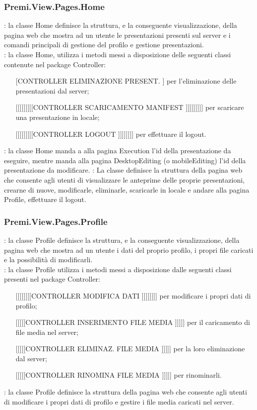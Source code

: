 {		\subsubsection{Premi.View.Pages.Home}{
			\textbf{\tipo}: la classe Home definisce la struttura, e la conseguente visualizzazione, della pagina web che mostra ad un utente le presentazioni presenti sul server e i comandi principali di gestione del profilo e gestione presentazioni.\\	
			\textbf{\relaz}: la classe Home, utilizza i metodi messi a disposizione delle seguenti classi contenute nel package Controller: 
			\begin{itemize}
				\item [[CONTROLLER ELIMINAZIONE PRESENT.]] per l'eliminazione delle presentazioni dal server;
				\item [[[[[[[[[[CONTROLLER SCARICAMENTO MANIFEST]]]]]]]]]] per scaricare una presentazione in locale;
				\item [[[[[[[[[[CONTROLLER LOGOUT]]]]]]]]] per effettuare il logout.
			\end{itemize} 
			\textbf{\interfacce}: la classe Home manda a alla pagina Execution l'id della presentazione da eseguire, mentre manda alla pagina DesktopEditing (o mobileEditing) l'id della presentazione da modificare.
			\textbf{\attivita}: La classe definisce la struttura della pagina web che consente agli utenti di visualizzare le anteprime delle proprie presentazioni, crearne di nuove, modificarle, eliminarle, scaricarle in locale e andare alla pagina Profile, effettuare il logout.\\
		}
		\subsubsection{Premi.View.Pages.Profile}{
			\textbf{\tipo}: la classe Profile definisce la struttura, e la conseguente visualizzazione, della pagina web che mostra ad un utente i dati del proprio profilo, i propri file caricati e la possibilità di modificarli. \\
			\textbf{\relaz}: la classe Profile utilizza i metodi messi a disposizione dalle seguenti classi presenti nel package Controller:
			\begin{itemize}
				\item [[[[[[[[[CONTROLLER MODIFICA DATI]]]]]]]]] per modificare i propri dati di profilo;
				\item [[[[[[CONTROLLER INSERIMENTO FILE MEDIA]]]]]] per il caricamento di file media nel server;
				\item [[[[[[CONTROLLER ELIMINAZ. FILE MEDIA]]]]]] per la loro eliminazione dal server;
				\item [[[[[[CONTROLLER RINOMINA FILE MEDIA]]]]]] per rinominarli.
			\end{itemize}
			\textbf{\attivita}: la classe Profile definisce la struttura della pagina web che consente agli utenti di modificare i propri dati di profilo e gestire i file media caricati nel server.\\
		}
}
